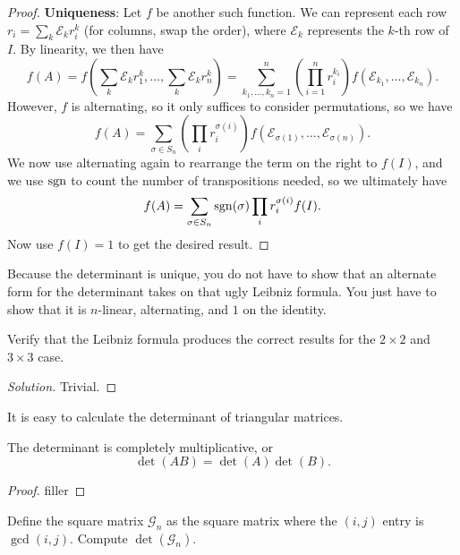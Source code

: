 \begin{proof}
\textbf{Uniqueness}: Let $f$ be another such function. We can represent
each row $r_i = \sum_k \mathcal{E}_k r_i^k$ (for columns, swap the
order), where $\mathcal{E}_k$ represents the $k$-th row of $I$. By
linearity, we then have
\[ f(A) = f\left(\sum_k \mathcal{E}_k r_1^k, \dots, \sum_k \mathcal{E}_k
r_n^k\right) = \sum_{k_1, \dots, k_n = 1}^n \left(\prod_{i = 1}^n
r_i^{k_i}\right) f(\mathcal{E}_{k_1}, \dots, \mathcal{E}_{k_n}). \]
However, $f$ is alternating, so it only suffices to consider
permutations, so we have
\[ f(A) = \sum_{\sigma \in S_n} \left(\prod_i r_i^{\sigma(i)}\right)
f(\mathcal{E}_{\sigma(1)}, \dots, \mathcal{E}_{\sigma(n)}). \]
We now use alternating again to rearrange the term on the right to
$f(I)$, and we use $\operatorname{sgn}$ to count the number of transpositions needed,
so we ultimately have
\[ f(A) = \sum_{\sigma \in S_n} \operatorname{sgn}(\sigma) \prod_i r_i^{\sigma(i)}
f(I). \]
Now use $f(I) = 1$ to get the desired result.
\end{proof}

\begin{rem}
Because the determinant is unique, you do not have to show that an
alternate form for the determinant takes on that ugly Leibniz formula.
You just have to show that it is $n$-linear, alternating, and $1$ on the
identity.
\end{rem}

\begin{prb}
Verify that the Leibniz formula produces the correct results for the $2
\times 2$ and $3 \times 3$ case.
\end{prb}

\begin{proof}[Solution]
Trivial.
\end{proof}

\begin{rem}
It is easy to calculate the determinant of triangular matrices.
\end{rem}

\begin{prop}
The determinant is completely multiplicative, or
\[ \det(AB) = \det(A)\det(B). \]
\end{prop}

\begin{proof}
filler
\end{proof}

\begin{prb}
Define the square matrix $\mathcal{G}_n$ as the square matrix where the
$(i, j)$ entry is $\gcd(i, j)$. Compute $\det(\mathcal{G}_n)$.
\end{prb}

